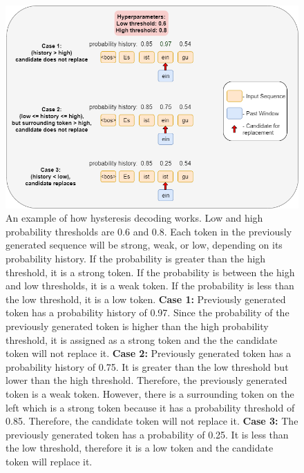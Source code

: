 \begin{figure}[hpbt!]
    \centering
    \includegraphics[width=\textwidth]{images/chap04_images/hysteresis_decoding.png}
    \caption{An example of how hysteresis decoding works. Low and high probability thresholds are 0.6 and 0.8. Each token in the previously generated sequence will be strong, weak, or low, depending on its probability history. If the probability is greater than the high threshold, it is a strong token. If the probability is between the high and low thresholds, it is a weak token. If the probability is less than the low threshold, it is a low token. \textbf{Case 1:} Previously generated token has a probability history of 0.97. Since the probability of the previously generated token is higher than the high probability threshold, it is assigned as a strong token and the the candidate token will not replace it. \textbf{Case 2:} Previously generated token has a probability history of 0.75. It is greater than the low threshold but lower than the high threshold. Therefore, the previously generated token is a weak token. However, there is a surrounding token on the left which is a strong token because it has a probability threshold of 0.85. Therefore, the candidate token will not replace it. \textbf{Case 3:} The previously generated token has a probability of 0.25. It is less than the low threshold, therefore it is a low token and the candidate token will replace it.}
    \label{fig:hysteresis_decoding_ex}
\end{figure}

